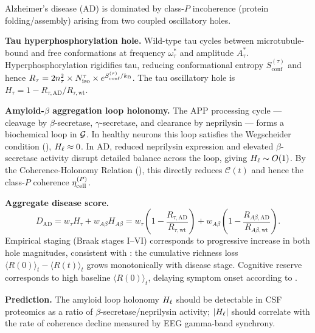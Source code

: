 \begin{example}
\label{ex:ch07-alzheimer}
Alzheimer's disease (AD) is dominated by class-$P$ incoherence (protein
folding/assembly) arising from two coupled oscillatory holes.

\textbf{Tau hyperphosphorylation hole.}  Wild-type tau cycles between
microtubule-bound and free conformations at frequency $\omega_{\tau}^{*}$ and
amplitude $A_{\tau}^{*}$.  Hyperphosphorylation rigidifies tau, reducing
conformational entropy $S_{\mathrm{conf}}^{(\tau)}$ and hence
$R_{\tau} = 2n_\tau^2 \times N_{\mathrm{iso}}^\tau \times
e^{S_{\mathrm{conf}}^{(\tau)}/k_{\mathrm{B}}}$.  The tau oscillatory hole is
$H_{\tau} = 1 - R_{\tau,\mathrm{AD}}/R_{\tau,\mathrm{wt}}$.

\textbf{Amyloid-$\beta$ aggregation loop holonomy.}  The APP processing
cycle — cleavage by $\beta$-secretase, $\gamma$-secretase, and clearance by
neprilysin — forms a biochemical loop in $\mathcal{G}$.  In healthy neurons this
loop satisfies the Wegscheider condition (),
$H_\ell \approx 0$.  In AD, reduced neprilysin expression and elevated
$\beta$-secretase activity disrupt detailed balance across the loop, giving
$H_\ell \sim O(1)$.  By the Coherence-Holonomy Relation
(), this directly reduces $\mathcal{C}(t)$
and hence the class-$P$ coherence $\eta_{\mathrm{cell}}^{(P)}$.

\textbf{Aggregate disease score.}
\begin{equation}
  D_{\mathrm{AD}}
  = w_\tau H_\tau + w_{A\beta} H_{A\beta}
  = w_\tau\!\left(1 - \frac{R_{\tau,\mathrm{AD}}}{R_{\tau,\mathrm{wt}}}\right)
    + w_{A\beta}\!\left(1 - \frac{R_{A\beta,\mathrm{AD}}}{R_{A\beta,\mathrm{wt}}}\right).
  \label{eq:ch07-AD-score}
\end{equation}
Empirical staging (Braak stages I--VI) corresponds to progressive increase
in both hole magnitudes, consistent with : the
cumulative richness loss $\langle R(0)\rangle_t - \langle R(t)\rangle_t$
grows monotonically with disease stage.  Cognitive reserve corresponds to
high baseline $\langle R(0)\rangle_t$, delaying symptom onset according to
.

\textbf{Prediction.}  The amyloid loop holonomy $H_\ell$ should be detectable
in CSF proteomics as a ratio of $\beta$-secretase/neprilysin activity;
$|H_\ell|$ should correlate with the rate of coherence decline measured by
EEG gamma-band synchrony.
\end{example}

